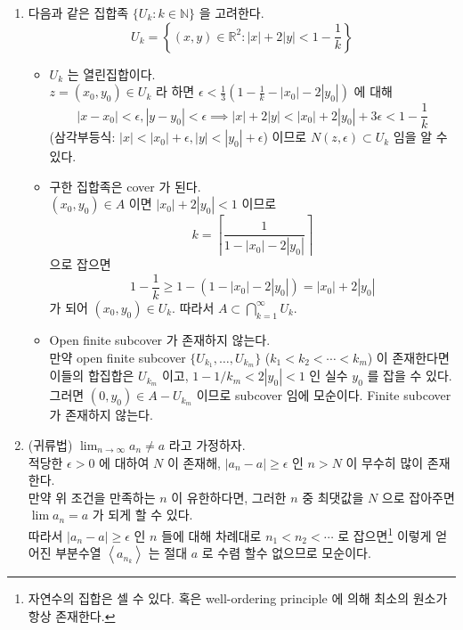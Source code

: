 \documentclass[12pt]{report}
\newcommand{\numl}[1]{\item[\large\textbf{\sffamily #1.}]}
\renewcommand{\span}[1]{\left\langle #1 \right\rangle}
\newcommand{\ra}{\rightarrow}
\newcommand{\abs}[1]{\left|#1\right|}
\newcommand{\ds}{\displaystyle}
\newcommand{\imp}{\implies}
\newcommand{\R}{\mathbb{R}}
\newcommand{\N}{\mathbb{N}}
\begin{document}
\begin{enumerate}
\numl{5} 다음과 같은 집합족 $\{U_k: k\in\N\}$ 을 고려한다.
$$U_k = \left\{(x, y)\in \R^2: \abs{x}+2\abs{y} < 1-\frac{1}{k} \right\}$$
\begin{itemize}
	\item $U_k$ 는 열린집합이다.\\
	$z = (x_0, y_0) \in U_k$ 라 하면 $\epsilon < \frac{1}{3}(1-\frac{1}{k}-\abs{x_0}-2\abs{y_0})$ 에 대해
	$$\abs{x - x_0} <\epsilon, \abs{y-y_0}<\epsilon \imp \abs{x}+2\abs{y} < \abs{x_0} + 2\abs{y_0} + 3\epsilon < 1 - \frac{1}{k}$$
	(삼각부등식: $\abs{x} < \abs{x_0}+\epsilon, \abs{y} < \abs{y_0}+\epsilon$) 이므로 $N(z, \epsilon) \subset U_k$ 임을 알 수 있다.
	\item 구한 집합족은 cover 가 된다.\\
	$(x_0, y_0)\in A$ 이면 $\abs{x_0} + 2\abs{y_0} < 1$ 이므로  $$k = \left\lceil \frac{1}{1 -\abs{x_0} - 2\abs{y_0}}\right\rceil$$ 으로 잡으면 $$1-\frac{1}{k} \geq 1 - (1 -\abs{x_0} - 2\abs{y_0}) = \abs{x_0} + 2\abs{y_0}$$ 가 되어 $(x_0, y_0)\in U_k$. 따라서 $A \subset \bigcap_{k = 1}^\infty U_k$.	
	\item Open finite subcover 가 존재하지 않는다.\\
	만약 open finite subcover $\{U_{k_1}, \dots, U_{k_m} \}$ ($k_1<k_2<\cdots<k_m$) 이 존재한다면 이들의 합집합은 $U_{k_m}$ 이고, $1 - 1/k_m < 2\abs{y_0} < 1$ 인 실수 $y_0$ 를 잡을 수 있다. 그러면 $(0, y_0) \in A - U_{k_m}$ 이므로 subcover 임에 모순이다. Finite subcover 가 존재하지 않는다.
\end{itemize}

\numl{6} (귀류법) $\ds \lim_{n\ra\infty} a_n \neq a$ 라고 가정하자.\\
적당한 $\epsilon > 0$ 에 대하여 $N$ 이 존재해, $\abs{a_n - a} \geq \epsilon$ 인 $n>N$ 이 무수히 많이 존재한다.\\
만약 위 조건을 만족하는 $n$ 이 유한하다면, 그러한 $n$ 중 최댓값을 $N$ 으로 잡아주면 $\lim a_n = a$ 가 되게 할 수 있다.\\
따라서 $\abs{a_n-a} \geq \epsilon$ 인 $n$ 들에 대해 차례대로 $n_1 < n_2 < \cdots$ 로 잡으면\footnote{자연수의 집합은 셀 수 있다. 혹은 well-ordering principle 에 의해 최소의 원소가 항상 존재한다.} 이렇게 얻어진 부분수열 $\span{a_{n_k}}$ 는 절대 $a$ 로 수렴 할수 없으므로 모순이다. 


\end{enumerate}
\end{document}
